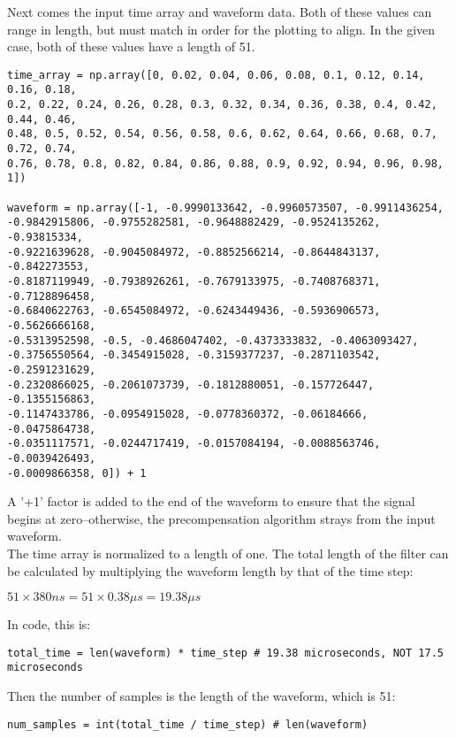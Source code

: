 \documentclass[11pt, a4paper]{article}
\theoremstyle{definition}
\numberwithin{equation}{section}
\begin{document}
Next comes the input time array and waveform data. Both of these values can range in length, but must match in order for the plotting to align. In the given case, both of these values have a length of 51.

\begin{verbatim}
time_array = np.array([0, 0.02, 0.04, 0.06, 0.08, 0.1, 0.12, 0.14, 0.16, 0.18,
0.2, 0.22, 0.24, 0.26, 0.28, 0.3, 0.32, 0.34, 0.36, 0.38, 0.4, 0.42, 0.44, 0.46, 
0.48, 0.5, 0.52, 0.54, 0.56, 0.58, 0.6, 0.62, 0.64, 0.66, 0.68, 0.7, 0.72, 0.74, 
0.76, 0.78, 0.8, 0.82, 0.84, 0.86, 0.88, 0.9, 0.92, 0.94, 0.96, 0.98, 1])

waveform = np.array([-1, -0.9990133642, -0.9960573507, -0.9911436254, 
-0.9842915806, -0.9755282581, -0.9648882429, -0.9524135262, -0.93815334, 
-0.9221639628, -0.9045084972, -0.8852566214, -0.8644843137, -0.842273553, 
-0.8187119949, -0.7938926261, -0.7679133975, -0.7408768371, -0.7128896458, 
-0.6840622763, -0.6545084972, -0.6243449436, -0.5936906573, -0.5626666168, 
-0.5313952598, -0.5, -0.4686047402, -0.4373333832, -0.4063093427, 
-0.3756550564, -0.3454915028, -0.3159377237, -0.2871103542, -0.2591231629, 
-0.2320866025, -0.2061073739, -0.1812880051, -0.157726447, -0.1355156863, 
-0.1147433786, -0.0954915028, -0.0778360372, -0.06184666, -0.0475864738, 
-0.0351117571, -0.0244717419, -0.0157084194, -0.0088563746, -0.0039426493, 
-0.0009866358, 0]) + 1
\end{verbatim}

A '+1' factor is added to the end of the waveform to ensure that the signal begins at zero--otherwise, the precompensation algorithm strays from the input waveform.
\\
The time array is normalized to a length of one. The total length of the filter can be calculated by multiplying the waveform length by that of the time step:

\begin{center}
    $51 \times 380ns = 51 \times 0.38 \mu s = 19.38 \mu s$
\end{center}

In code, this is:

\begin{verbatim}
total_time = len(waveform) * time_step # 19.38 microseconds, NOT 17.5 microseconds
\end{verbatim}

Then the number of samples is the length of the waveform, which is 51:

\begin{verbatim}
num_samples = int(total_time / time_step) # len(waveform)
\end{verbatim}
\end{document}
